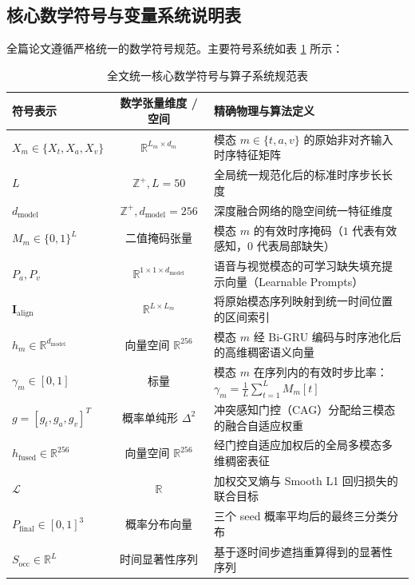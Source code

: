 \subsection{核心数学符号与变量系统说明表}
全篇论文遵循严格统一的数学符号规范。主要符号系统如表 \ref{tab:full_symbols} 所示：

\begin{table}[htp!]
\centering
\small
\renewcommand\arraystretch{1.3}
\caption{全文统一核心数学符号与算子系统规范表}
\label{tab:full_symbols}
\begin{tabularx}{\textwidth}{|l|c|X|}
\hline
\textbf{符号表示} & \textbf{数学张量维度 / 空间} & \textbf{精确物理与算法定义} \\ \hline
$X_m \in \{X_t, X_a, X_v\}$ & $\mathbb{R}^{L_m \times d_m}$ & 模态 $m \in \{t, a, v\}$ 的原始非对齐输入时序特征矩阵 \\ \hline
$L$ & $\mathbb{Z}^+, L=50$ & 全局统一规范化后的标准时序步长长度 \\ \hline
$d_{\text{model}}$ & $\mathbb{Z}^+, d_{\text{model}}=256$ & 深度融合网络的隐空间统一特征维度 \\ \hline
$M_m \in \{0, 1\}^{L}$ & 二值掩码张量 & 模态 $m$ 的有效时序掩码（$1$ 代表有效感知，$0$ 代表局部缺失） \\ \hline
$P_a, P_v$ & $\mathbb{R}^{1 \times 1 \times d_{\text{model}}}$ & 语音与视觉模态的可学习缺失填充提示向量（Learnable Prompts） \\ \hline
$\mathbf{I}_{\text{align}}$ & $\mathbb{R}^{L \times L_m}$ & 将原始模态序列映射到统一时间位置的区间索引 \\ \hline
$h_m \in \mathbb{R}^{d_{\text{model}}}$ & 向量空间 $\mathbb{R}^{256}$ & 模态 $m$ 经 Bi-GRU 编码与时序池化后的高维稠密语义向量 \\ \hline
$\gamma_m \in [0, 1]$ & 标量 & 模态 $m$ 在序列内的有效时步比率：$\gamma_m = \frac{1}{L} \sum_{t=1}^L M_m[t]$ \\ \hline
$g = [g_t, g_a, g_v]^T$ & 概率单纯形 $\Delta^2$ & 冲突感知门控（CAG）分配给三模态的融合自适应权重 \\ \hline
$h_{\text{fused}} \in \mathbb{R}^{256}$ & 向量空间 $\mathbb{R}^{256}$ & 经门控自适应加权后的全局多模态多维稠密表征 \\ \hline
$\mathcal{L}$ & $\mathbb{R}$ & 加权交叉熵与 Smooth L1 回归损失的联合目标 \\ \hline
$P_{\text{final}} \in [0, 1]^3$ & 概率分布向量 & 三个 seed 概率平均后的最终三分类分布 \\ \hline
$S_{\text{occ}} \in \mathbb{R}^{L}$ & 时间显著性序列 & 基于逐时间步遮挡重算得到的显著性序列 \\ \hline
\end{tabularx}
\end{table}
